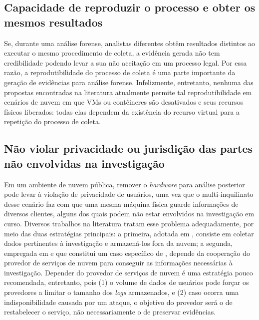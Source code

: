 \documentclass[conference]{IEEEtran}
\begin{document}
\subsection{Capacidade de reproduzir o processo e obter os mesmos resultados}

Se, durante uma análise forense, analistas diferentes obtêm resultados distintos ao executar o mesmo procedimento de coleta, a evidência gerada não tem credibilidade podendo levar a sua não aceitação em um processo legal. 
%
Por essa razão, a reprodutibilidade do processo de coleta é uma parte importante da geração de evidências para análise forense.
%
Infelizmente, entretanto, nenhuma das propostas encontradas na literatura atualmente permite tal reprodutibilidade em cenários de nuvem em que VMs ou contêineres são desativados e seus recursos físicos liberados: todas elas dependem da existência do recurso virtual para a repetição do processo de coleta.


\subsection{Não violar privacidade ou jurisdição das partes não envolvidas na investigação}

Em um ambiente de nuvem pública, remover o \textit{hardware} para análise posterior pode levar à violação de privacidade de usuários, uma vez que o multi-inquilinato desse cenário faz com que uma mesma máquina física guarde informações de diversos clientes, alguns dos quais podem não estar envolvidos na investigação em curso.
%
Diversos trabalhos na literatura tratam esse problema adequadamente, por meio das duas estratégias principais: a primeira, adotada em \cite{Reichert_Auto_acquisition:2015,George_DF2CE:2012,Poisel_VMI:2013,Dykstra_FROST:2013}, consiste em coletar dados pertinentes à investigação e armazená-los fora da nuvem; a segunda, empregada em \cite{Sang_Log_approach:2013} e que constitui um caso específico de \cite{George_DF2CE:2012}, depende da cooperação do provedor de serviços de nuvem para conseguir as informações necessárias à investigação. 
%
Depender do provedor de serviços de nuvem é uma estratégia pouco recomendada, entretanto, pois (1) o volume de dados de usuários pode forçar os provedores a limitar o tamanho dos \textit{logs} armazenados, e (2) caso ocorra uma indisponibilidade causada por um ataque, o objetivo do provedor será o de restabelecer o serviço, não necessariamente o de preservar evidências\cite{Clarke_Review_of_Challenges:2015}. 
\end{document}
